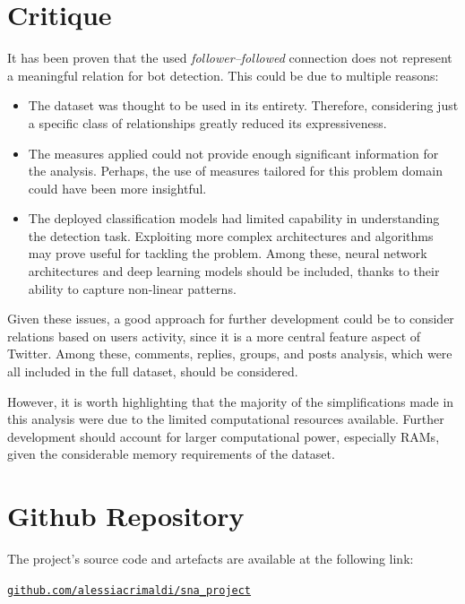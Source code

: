 \documentclass[12pt, a4paper]{article}
\begin{document}
\section{Critique} \label{critique}
	It has been proven that the used \textit{follower--followed} connection does not represent a meaningful relation for bot detection. This could be due to multiple reasons:
	\begin{itemize}
		\item The dataset was thought to be used in its entirety. Therefore, considering just a specific class of relationships greatly reduced its expressiveness.
		\item The measures applied could not provide enough significant information for the analysis. Perhaps, the use of measures tailored for this problem domain could have been more insightful.
		\item The deployed classification models had limited capability in understanding the detection task. Exploiting more complex architectures and algorithms may prove useful for tackling the problem. Among these, neural network architectures and deep learning models should be included, thanks to their ability to capture non-linear patterns.
	\end{itemize}
	Given these issues, a good approach for further development could be to consider relations based on users activity, since it is a more central feature aspect of Twitter. Among these, comments, replies, groups, and posts analysis, which were all included in the full dataset, should be considered.
	\vspace{0.2cm}
	
	However, it is worth highlighting that the majority of the simplifications made in this analysis were due to the limited computational resources available. Further development should account for larger computational power, especially RAMs, given the considerable memory requirements of the dataset.
	
	
\newpage




\newpage
\appendix
\section{Github Repository}
	The project's source code and artefacts are available at the following link:
	
	\href{https://github.com/alessiacrimaldi/sna_project}{\texttt{github.com/alessiacrimaldi/sna\_project}}
\end{document}
